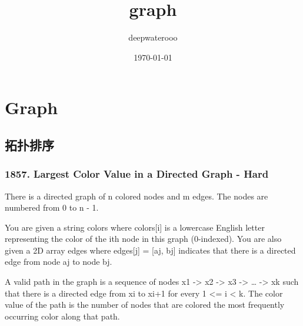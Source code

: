 \documentclass[9pt, b5paaper]{book}
\author{deepwaterooo}
\date{\today}
\title{graph}
\begin{document}
\maketitle
\tableofcontents


\chapter{Graph}
\label{sec-1}
\section{拓扑排序}
\label{sec-1-1}
\subsection{1857. Largest Color Value in a Directed Graph - Hard}
\label{sec-1-1-1}
There is a directed graph of n colored nodes and m edges. The nodes are numbered from 0 to n - 1.

You are given a string colors where colors[i] is a lowercase English letter representing the color of the ith node in this graph (0-indexed). You are also given a 2D array edges where edges[j] = [aj, bj] indicates that there is a directed edge from node aj to node bj.

A valid path in the graph is a sequence of nodes x1 -> x2 -> x3 -> \ldots{} -> xk such that there is a directed edge from xi to xi+1 for every 1 <= i < k. The color value of the path is the number of nodes that are colored the most frequently occurring color along that path.
\end{document}

